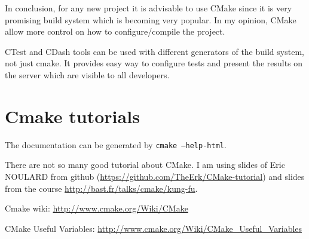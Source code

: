 \documentclass[a4paper,10pt]{article}
\begin{document}
In conclusion, for any new project it is advisable to use CMake since it is very promising build system which is becoming very popular. In my opinion, CMake allow more control on how to configure/compile the project. 

CTest and CDash tools can be used with different generators of the build system, not just cmake. It provides easy way to configure tests and present the results on the server which are visible to all developers. 





\section{Cmake tutorials}

The documentation can be generated by \texttt{cmake --help-html}.

There are not so many good tutorial about CMake. I am using slides of Eric NOULARD from github (\url{https://github.com/TheErk/CMake-tutorial}) and  slides from the course \url{http://bast.fr/talks/cmake/kung-fu}.

Cmake wiki: \url{http://www.cmake.org/Wiki/CMake}

CMake Useful Variables: \url{http://www.cmake.org/Wiki/CMake_Useful_Variables}
\end{document}
